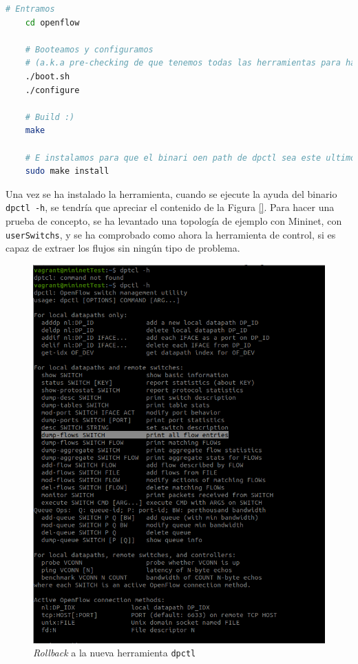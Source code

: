 \begin{lstlisting}[language= bash, style=Consola, caption={Construcción de la nueva versión de dpctl},label=code:dpctlold2]
    # Entramos
    cd openflow

    # Booteamos y configuramos 
    # (a.k.a pre-checking de que tenemos todas las herramientas para hacer el make)
    ./boot.sh
    ./configure

    # Build :)
    make

    # E instalamos para que el binari oen path de dpctl sea este ultimo
    sudo make install
\end{lstlisting}
\vspace{0.5cm}


Una vez se ha instalado la herramienta, cuando se ejecute la ayuda del binario \texttt{dpctl -h}, se tendría que apreciar el contenido de la Figura \ref{}. Para hacer una prueba de concepto, se ha levantado una topología de ejemplo con Mininet, con \texttt{userSwitchs}, y se ha comprobado como ahora la herramienta de control, si es capaz de extraer los flujos sin ningún tipo de problema.

\begin{figure}[ht]
    \centering
    \includegraphics[width=\textwidth]{archivos/img/dev/dpctl_5.png}
    \caption{\textit{Rollback} a la nueva herramienta \texttt{dpctl}}
    \label{fig:dpctl_5}
\end{figure}

